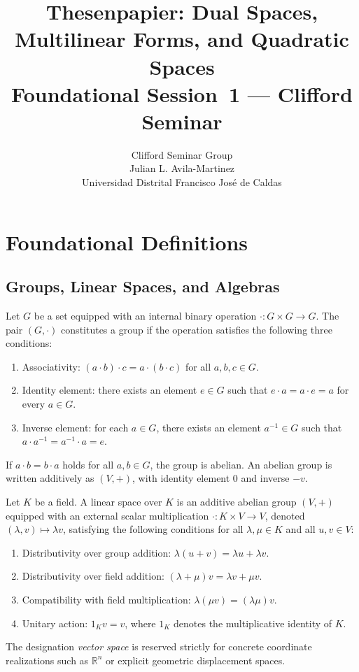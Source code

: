 \documentclass[11pt,a4paper]{article}
\title{\Large\bfseries Thesenpapier: Dual Spaces, Multilinear Forms, and
  Quadratic Spaces\\[0.3em]
\large Foundational Session~1 --- Clifford Seminar}
\author{Clifford Seminar Group\\
\small Julian L. Avila-Martinez\\
\small Universidad Distrital Francisco Jos{\'e} de Caldas}
\date{}
\newcommand{\R}{\mathbb{R}}
\begin{document}
\maketitle

\section{Foundational Definitions}
\label{sec:definitions}

\subsection{Groups, Linear Spaces, and Algebras}
\label{subsec:linear_spaces}

Let $G$ be a set equipped with an internal binary operation
$\cdot : G \times G \to G$.
The pair $(G, \cdot)$ constitutes a group if the operation satisfies the
following three conditions:
\begin{enumerate}
  \item[$\mathcal{G}_1$] Associativity: $(a \cdot b) \cdot c = a \cdot (b \cdot
    c)$ for all $a, b, c \in G$.
  \item[$\mathcal{G}_2$] Identity element: there exists an element $e \in G$
    such that $e \cdot a = a \cdot e = a$ for every $a \in G$.
  \item[$\mathcal{G}_3$] Inverse element: for each $a \in G$, there exists an
    element $a^{-1} \in G$ such that $a \cdot a^{-1} = a^{-1} \cdot a = e$.
\end{enumerate}
If $a \cdot b = b \cdot a$ holds for all $a, b \in G$, the group is abelian.
An abelian group is written additively as $(V, +)$, with identity element $0$
and inverse $-v$.

Let $K$ be a field.
A linear space over $K$ is an additive abelian group $(V, +)$ equipped with an
external scalar multiplication $\cdot : K \times V \to V$, denoted $(\lambda, v)
\mapsto \lambda v$, satisfying the following conditions for all $\lambda, \mu
\in K$ and all $u, v \in V$:
\begin{enumerate}
  \item Distributivity over group addition: $\lambda (u + v) = \lambda u +
    \lambda v$.
  \item Distributivity over field addition: $(\lambda + \mu) v = \lambda v + \mu
    v$.
  \item Compatibility with field multiplication: $\lambda (\mu v) = (\lambda
    \mu) v$.
  \item Unitary action: $1_K v = v$, where $1_K$ denotes the multiplicative
    identity of $K$.
\end{enumerate}
The designation \emph{vector space} is reserved strictly for concrete coordinate
realizations such as $\R^n$ or explicit geometric displacement spaces.
\end{document}
